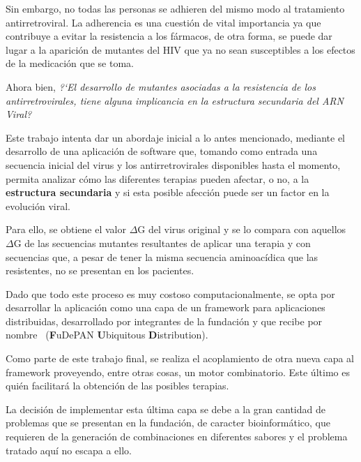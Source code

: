   Sin embargo, no todas las personas se adhieren del mismo modo al tratamiento antirretroviral. La adherencia es una cuesti\'on de vital
  importancia ya que contribuye a evitar la resistencia a los f\'armacos, de otra forma, se puede dar lugar a la aparici\'on de mutantes del HIV que
  ya no sean susceptibles a los efectos de la medicaci\'on que se toma.
  
  Ahora bien, \textit{?`El desarrollo de mutantes asociadas a la resistencia de los antirretrovirales, tiene alguna implicancia en la estructura 
  secundaria del ARN Viral?}

  Este trabajo intenta dar un abordaje inicial a lo antes mencionado, me\-dian\-te el desarrollo de una aplicaci\'on de 
  software que, tomando como entrada una secuencia inicial del virus y los antirretrovirales disponibles hasta el momento, permita analizar c\'omo 
  las diferentes terapias pueden afectar, o no, a la \textbf{estructura secundaria} y si esta posible afecci\'on puede ser un factor en la evoluci\'on viral.

  Para ello, se obtiene el valor $\Delta$G del virus original y se lo compara con aquellos $\Delta$G de las secuencias mutantes resultantes de 
  aplicar una terapia y con secuencias que, a pesar de tener la misma secuencia aminoac\'idica que las resistentes, no se presentan en los pacientes.

  Dado que todo este proceso es muy costoso computacionalmente, se opta por desarrollar la aplicaci\'on como una capa de un framework para
  aplicaciones distribuidas, desarrollado por integrantes de la fundaci\'on y que recibe por nombre \fud \ (\textbf{F}uDePAN \textbf{U}biquitous
  \textbf{D}istribution).

  Como parte de este trabajo final, se realiza el acoplamiento de otra nueva capa al framework proveyendo, entre otras cosas, un motor combinatorio.
  Este \'ultimo es qui\'en facilitar\'a la obtenci\'on de las posibles terapias.

  La decisi\'on de implementar esta \'ultima capa se debe a la gran cantidad de problemas que se presentan en la fundaci\'on, de caracter
  bioinform\'atico, que requieren de la generaci\'on de combinaciones en diferentes sabores y el problema tratado aqu\'i no escapa a ello.
